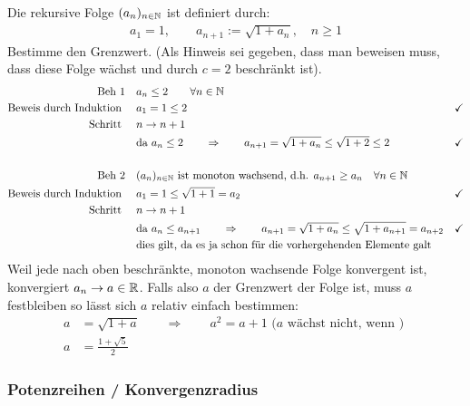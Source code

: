 \documentclass[a4paper]{article}
\begin{document}
	\begin{fmerke}
		Die rekursive Folge $(a_n)_{n \in \mathbb{N}}$ ist definiert durch:
		\begin{align*}
			a_1 = 1, \qquad a_{n+1} := \sqrt{1 + a_n}, \quad n \geq 1
		\end{align*}
		Bestimme den Grenzwert. (Als Hinweis sei gegeben, dass man beweisen muss, dass diese Folge wächst und durch $c=2$ beschränkt ist).
		\begin{align*}
			\text{Beh 1}\quad&a_n \leq 2 \qquad \forall n \in \mathbb{N}\\
			\text{Beweis durch Induktion }\quad& a_1 = 1 \leq 2 &\checkmark\\
			\text{Schritt }\quad&n \rightarrow n+1 \\
			&\text{da }a_n \leq 2 \qquad \Rightarrow \qquad a_{n+1} = \sqrt{1+a_n} \leq \sqrt{1+2} \leq 2& \checkmark\\
			\\
			\text{Beh 2}\quad&(a_n)_{n\in \mathbb{N}} \text{ ist monoton wachsend, d.h. $a_{n+1} \geq a_n \quad \forall n \in \mathbb{N}$}\\
			\text{Beweis durch Induktion }\quad&a_1 = 1 \leq \sqrt{1+1} = a_2 &\checkmark\\
			\text{Schritt }\quad&n \rightarrow n+1 \\
			&\text{da } a_n \leq a_{n+1} \qquad \Rightarrow \qquad a_{n+1} = \sqrt{1 + a_n} \leq \sqrt{1 + a_{n+1}} = a_{n+2} & \checkmark\\
			&\text{dies gilt, da es ja schon für die vorhergehenden Elemente galt }
		\end{align*}
		Weil jede nach oben beschränkte, monoton wachsende Folge konvergent ist, konvergiert $a_n \rightarrow a \in \mathbb{R}$. Falls also $a$ der Grenzwert der Folge ist, muss $a$ festbleiben so lässt sich $a$ relativ einfach bestimmen:
		\begin{align*}
			a &= \sqrt{1+a} \qquad \Longrightarrow \qquad a^2 = a + 1 \text{ ($a$ wächst nicht, wenn ) }\\
			a &= \frac{1+\sqrt{5}}{2} 
		\end{align*}

	\end{fmerke}
		
	\newpage
	\subsubsection{Potenzreihen / Konvergenzradius}
		
\end{document}
